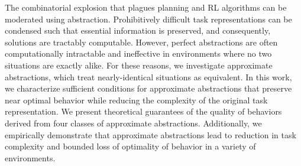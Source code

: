 The combinatorial explosion that plagues planning and \ac{RL} algorithms can be moderated using abstraction. Prohibitively difficult task representations can be condensed such that essential information is preserved, and consequently, solutions are tractably computable. However, perfect abstractions are often computationally intractable and ineffective in environments where no two situations are exactly alike. For these reasons, we investigate approximate abstractions, which treat nearly-identical situations as equivalent. In this work, we characterize sufficient conditions for approximate abstractions that preserve near optimal behavior while reducing the complexity of the original task representation. We present theoretical guarantees of the quality of behaviors derived from four classes of approximate abstractions. Additionally, we empirically demonstrate that approximate abstractions lead to reduction in task complexity and bounded loss of optimality of behavior in a variety of environments. %










%
%





